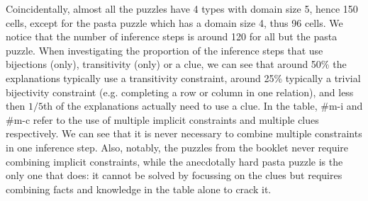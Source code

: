 Coincidentally, almost all the puzzles have 4 types with domain size 5,  
hence 150 cells, except for the pasta puzzle which has a domain size 4, thus 96 cells. We notice that the number of inference steps is around 120 for all but the pasta puzzle. When investigating the proportion of the inference steps that use bijections (only), transitivity (only) or a clue, we can see that around 50\% the explanations typically use a transitivity constraint, around 25\% typically a trivial bijectivity constraint (e.g. completing a row or column in one relation), and less then $1/5$th of the explanations actually need to use a clue.
In the table, \#m-i and \#m-c refer to the use of multiple implicit constraints and multiple clues respectively. We can see that it is never necessary to combine multiple constraints in one inference step. Also, notably, the puzzles from the booklet never require combining implicit constraints, while the anecdotally hard pasta puzzle is the only one that does: it cannot be solved by focussing on the clues but requires combining facts and knowledge in the table alone to crack it.

